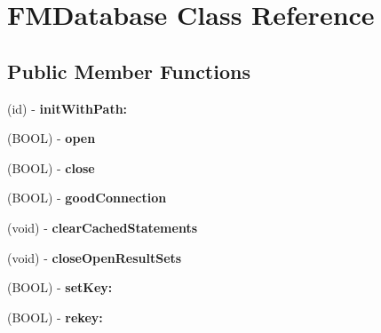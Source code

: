 \hypertarget{interface_f_m_database}{
\section{FMDatabase Class Reference}
\label{interface_f_m_database}
}
\subsection*{Public Member Functions}
\begin{DoxyCompactItemize}
\item 
\hypertarget{interface_f_m_database_a23f1ad0f2257d42cba224b40589dd67e}{
(id) -\/ {\bfseries initWithPath:}}
\label{interface_f_m_database_a23f1ad0f2257d42cba224b40589dd67e}

\item 
\hypertarget{interface_f_m_database_a08144f3bdd732b28634b7ab5f2d85e4e}{
(BOOL) -\/ {\bfseries open}}
\label{interface_f_m_database_a08144f3bdd732b28634b7ab5f2d85e4e}

\item 
\hypertarget{interface_f_m_database_af88fd0e3114c16936d9e160c9f73c56a}{
(BOOL) -\/ {\bfseries close}}
\label{interface_f_m_database_af88fd0e3114c16936d9e160c9f73c56a}

\item 
\hypertarget{interface_f_m_database_aec2a7340302084e06010980831310226}{
(BOOL) -\/ {\bfseries goodConnection}}
\label{interface_f_m_database_aec2a7340302084e06010980831310226}

\item 
\hypertarget{interface_f_m_database_aa1298e44f6383f61db5ec1a34dab9834}{
(void) -\/ {\bfseries clearCachedStatements}}
\label{interface_f_m_database_aa1298e44f6383f61db5ec1a34dab9834}

\item 
\hypertarget{interface_f_m_database_aab7a2e5bec8d00c23eef4b022a0d4a7c}{
(void) -\/ {\bfseries closeOpenResultSets}}
\label{interface_f_m_database_aab7a2e5bec8d00c23eef4b022a0d4a7c}

\item 
\hypertarget{interface_f_m_database_a07e7e681323467b0df5d4a24c3337710}{
(BOOL) -\/ {\bfseries setKey:}}
\label{interface_f_m_database_a07e7e681323467b0df5d4a24c3337710}

\item 
\hypertarget{interface_f_m_database_a76bfb1fffe91e0bc1171906df135c24f}{
(BOOL) -\/ {\bfseries rekey:}}
\label{interface_f_m_database_a76bfb1fffe91e0bc1171906df135c24f}


\end{DoxyCompactItemize}
